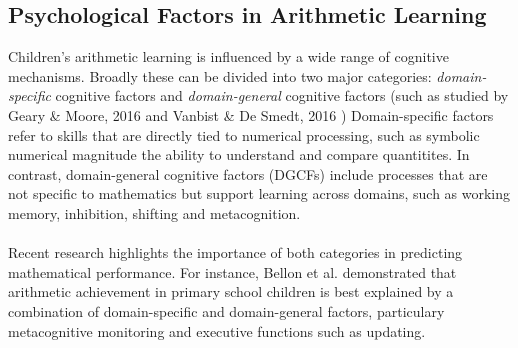 \subsection{Psychological Factors in Arithmetic Learning}
Children's arithmetic learning is influenced by a wide range of cognitive mechanisms.
Broadly these can be divided into two major categories: \textit{domain-specific} cognitive factors and \textit{domain-general} cognitive factors (such as studied by Geary \& Moore, 2016 \cite{geary_chapter_2016} and Vanbist \& De Smedt, 2016 \cite{vanbinst_chapter_2016})
Domain-specific factors refer to skills that are directly tied to numerical processing, such as symbolic numerical magnitude  the ability to understand and compare quantitites. 
In contrast, domain-general cognitive factors (DGCFs) include processes that are not specific to mathematics but support learning across domains, such as working memory, inhibition, shifting and metacognition. \\ \\
Recent research highlights the importance of both categories in predicting mathematical performance.
For instance, Bellon et al. \cite{bellon_more_2019} demonstrated that arithmetic achievement in primary school children is best explained by a combination of domain-specific and domain-general factors, particulary metacognitive monitoring and executive functions such as updating. 

